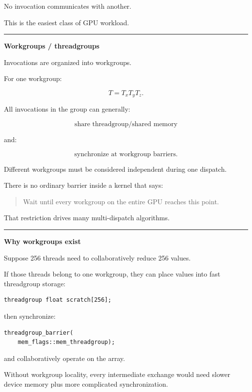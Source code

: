 No invocation communicates with another.

This is the easiest class of GPU workload.

\begin{center}\rule{0.5\linewidth}{0.5pt}\end{center}

\textbf{Workgroups / threadgroups}

Invocations are organized into workgroups.

For one workgroup:

\[
T=
T_xT_yT_z.
\]

All invocations in the group can generally:

\[
\text{share threadgroup/shared memory}
\]

and:

\[
\text{synchronize at workgroup barriers}.
\]

Different workgroups must be considered independent during one dispatch.

There is no ordinary barrier inside a kernel that says:

\begin{quote}
Wait until every workgroup on the entire GPU reaches this point.
\end{quote}

That restriction drives many multi-dispatch algorithms.

\begin{center}\rule{0.5\linewidth}{0.5pt}\end{center}

\textbf{Why workgroups exist}

Suppose 256 threads need to collaboratively reduce 256 values.

If those threads belong to one workgroup, they can place values into fast threadgroup storage:

\protect{}\label{et2xom}%
\begin{verbatim}
threadgroup float scratch[256];
\end{verbatim}

then synchronize:

\protect{}\label{yx8mk8}%
\begin{verbatim}
threadgroup_barrier(
    mem_flags::mem_threadgroup);
\end{verbatim}

and collaboratively operate on the array.

Without workgroup locality, every intermediate exchange would need slower device memory plus more complicated synchronization.

